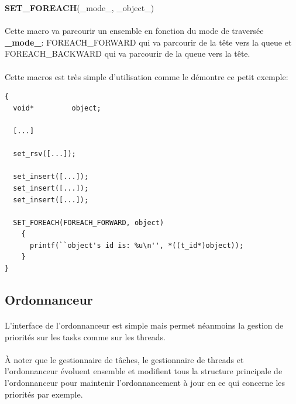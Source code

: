 \documentclass[10pt,a4wide]{article}
\begin{document}
\hspace{1.5cm}\textbf{SET\_FOREACH}(\_mode\_, \_object\_)

\paragraph{}

Cette macro va parcourir un ensemble en fonction du mode de travers\'ee
\textbf{\_mode\_}: FOREACH\_FORWARD qui va parcourir de la t\^ete vers
la queue et FOREACH\_BACKWARD qui va parcourir de la queue vers la t\^ete.

\paragraph{}

Cette macros est tr\`es simple d'utilisation comme le d\'emontre ce
petit exemple:

\begin{verbatim}
{
  void*         object;

  [...]

  set_rsv([...]);

  set_insert([...]);
  set_insert([...]);
  set_insert([...]);

  SET_FOREACH(FOREACH_FORWARD, object)
    {
      printf(``object's id is: %u\n'', *((t_id*)object));
    }
}
\end{verbatim}

\subsection{Ordonnanceur}

\paragraph{}

L'interface de l'ordonnanceur est simple mais permet n\'eanmoins la gestion
de priorit\'es sur les tasks comme sur les threads.

\paragraph{}

\`A noter que le gestionnaire de t\^aches, le gestionnaire de threads et
l'ordonnanceur \'evoluent ensemble et modifient tous la structure principale
de l'ordonnanceur pour maintenir l'ordonnancement \`a jour en ce qui
concerne les priorit\'es par exemple.
\end{document}
